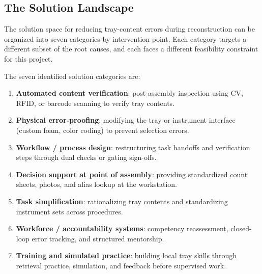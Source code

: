 \documentclass[10pt,a4paper]{article}
\begin{document}
\subsection{The Solution Landscape}
\label{sec:solution-landscape}

The solution space for reducing tray-content errors during reconstruction can
be organized into seven categories by intervention point. Each category targets
a different subset of the root causes, and each faces a
different feasibility constraint for this project.

The seven identified solution categories are:
\begin{enumerate}
  \item \textbf{Automated content verification}: post-assembly inspection using CV, RFID, or barcode scanning to verify tray contents.
  \item \textbf{Physical error-proofing}: modifying the tray or instrument interface (custom foam, color coding) to prevent selection errors.
  \item \textbf{Workflow / process design}: restructuring task handoffs and verification steps through dual checks or gating sign-offs.
  \item \textbf{Decision support at point of assembly}: providing standardized count sheets, photos, and alias lookup at the workstation.
  \item \textbf{Task simplification}: rationalizing tray contents and standardizing instrument sets across procedures.
  \item \textbf{Workforce / accountability systems}: competency reassessment, closed-loop error tracking, and structured mentorship.
  \item \textbf{Training and simulated practice}: building local tray skills through retrieval practice, simulation, and feedback before supervised work.
\end{enumerate}
\end{document}
